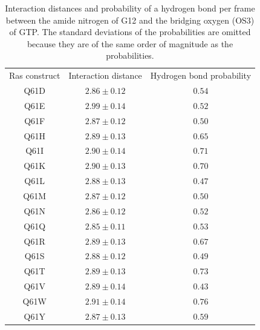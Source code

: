 \begin{table}
    \caption[Interactions between GTP and residue G12 in Ras]{
        Interaction distances and probability of a hydrogen bond per frame between the amide nitrogen of G12 and the bridging oxygen (OS3) of GTP. 
        The standard deviations of the probabilities are omitted because they are of the same order of magnitude as the probabilities.
    }
    \begin{center}
    \begin{tabular}{ccc}
    \toprule
   \rowcolor{lgray}
    Ras construct & Interaction distance & Hydrogen bond probability\\
    \cmidrule(r){1-1}\cmidrule(rl){2-2}\cmidrule(l){3-3}
Q61D  & $2.86 \pm   0.12$ &   $0.54 $\\%
Q61E  & $2.99 \pm   0.14$ &   $0.52 $\\%
Q61F  & $2.87 \pm   0.12$ &   $0.50 $\\%
Q61H  & $2.89 \pm   0.13$ &   $0.65 $\\%
Q61I  & $2.90 \pm   0.14$ &   $0.71 $\\%
Q61K  & $2.90 \pm   0.13$ &   $0.70 $\\%
Q61L  & $2.88 \pm   0.13$ &   $0.47 $\\%
Q61M  & $2.87 \pm   0.12$ &   $0.50 $\\%
Q61N  & $2.86 \pm   0.12$ &   $0.52 $\\%
Q61Q  & $2.85 \pm   0.11$ &   $0.53 $\\%
Q61R  & $2.89 \pm   0.13$ &   $0.67 $\\%
Q61S  & $2.88 \pm   0.12$ &   $0.49 $\\%
Q61T  & $2.89 \pm   0.13$ &   $0.73 $\\%
Q61V  & $2.89 \pm   0.14$ &   $0.43 $\\%
Q61W  & $2.91 \pm   0.14$ &   $0.76 $\\%
Q61Y  & $2.87 \pm   0.13$ &   $0.59 $\\%

\bottomrule
\end{tabular}
    \end{center}
    \label{tbl:ras-g12}
\end{table}

